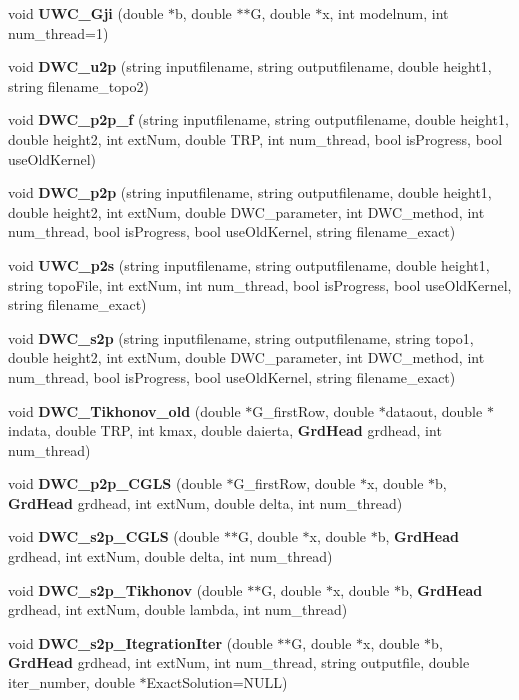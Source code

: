 \begin{DoxyCompactItemize}
\item 
void \textbf{ U\+W\+C\+\_\+\+Gji} (double $\ast$b, double $\ast$$\ast$G, double $\ast$x, int modelnum, int num\+\_\+thread=1)
\item 
void \textbf{ D\+W\+C\+\_\+u2p} (string inputfilename, string outputfilename, double height1, string filename\+\_\+topo2)
\item 
void \textbf{ D\+W\+C\+\_\+p2p\+\_\+f} (string inputfilename, string outputfilename, double height1, double height2, int ext\+Num, double T\+RP, int num\+\_\+thread, bool is\+Progress, bool use\+Old\+Kernel)
\item 
void \textbf{ D\+W\+C\+\_\+p2p} (string inputfilename, string outputfilename, double height1, double height2, int ext\+Num, double D\+W\+C\+\_\+parameter, int D\+W\+C\+\_\+method, int num\+\_\+thread, bool is\+Progress, bool use\+Old\+Kernel, string filename\+\_\+exact)
\item 
void \textbf{ U\+W\+C\+\_\+p2s} (string inputfilename, string outputfilename, double height1, string topo\+File, int ext\+Num, int num\+\_\+thread, bool is\+Progress, bool use\+Old\+Kernel, string filename\+\_\+exact)
\item 
void \textbf{ D\+W\+C\+\_\+s2p} (string inputfilename, string outputfilename, string topo1, double height2, int ext\+Num, double D\+W\+C\+\_\+parameter, int D\+W\+C\+\_\+method, int num\+\_\+thread, bool is\+Progress, bool use\+Old\+Kernel, string filename\+\_\+exact)
\item 
void \textbf{ D\+W\+C\+\_\+\+Tikhonov\+\_\+old} (double $\ast$G\+\_\+first\+Row, double $\ast$dataout, double $\ast$indata, double T\+RP, int kmax, double daierta, \textbf{ Grd\+Head} grdhead, int num\+\_\+thread)
\item 
void \textbf{ D\+W\+C\+\_\+p2p\+\_\+\+C\+G\+LS} (double $\ast$G\+\_\+first\+Row, double $\ast$x, double $\ast$b, \textbf{ Grd\+Head} grdhead, int ext\+Num, double delta, int num\+\_\+thread)
\item 
void \textbf{ D\+W\+C\+\_\+s2p\+\_\+\+C\+G\+LS} (double $\ast$$\ast$G, double $\ast$x, double $\ast$b, \textbf{ Grd\+Head} grdhead, int ext\+Num, double delta, int num\+\_\+thread)
\item 
void \textbf{ D\+W\+C\+\_\+s2p\+\_\+\+Tikhonov} (double $\ast$$\ast$G, double $\ast$x, double $\ast$b, \textbf{ Grd\+Head} grdhead, int ext\+Num, double lambda, int num\+\_\+thread)
\item 
void \textbf{ D\+W\+C\+\_\+s2p\+\_\+\+Itegration\+Iter} (double $\ast$$\ast$G, double $\ast$x, double $\ast$b, \textbf{ Grd\+Head} grdhead, int ext\+Num, int num\+\_\+thread, string outputfile, double iter\+\_\+number, double $\ast$Exact\+Solution=N\+U\+LL)

\end{DoxyCompactItemize}
